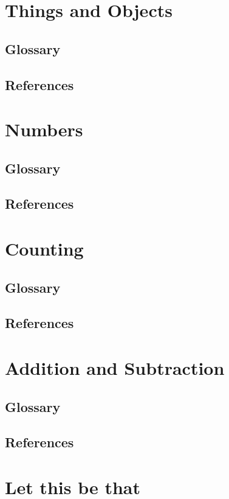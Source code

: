 \documentclass{report}
\begin{document}
\chapter{Things and Objects}%
\section{Glossary}
\section{References}
\pagebreak


\chapter{Numbers}%
\section{Glossary}
\section{References}
\pagebreak


\chapter{Counting}%
\section{Glossary}
\section{References}
\pagebreak


\chapter{Addition and Subtraction}%
\section{Glossary}
\section{References}
\pagebreak


\chapter{Let this be that}%
\end{document}
